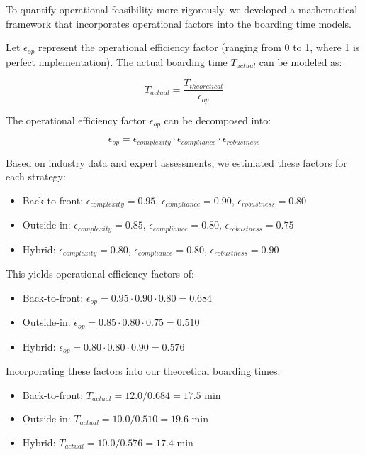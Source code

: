 To quantify operational feasibility more rigorously, we developed a mathematical framework that incorporates operational factors into the boarding time models.

Let $\epsilon_{op}$ represent the operational efficiency factor (ranging from 0 to 1, where 1 is perfect implementation). The actual boarding time $T_{actual}$ can be modeled as:

\begin{equation}
T_{actual} = \frac{T_{theoretical}}{\epsilon_{op}}
\end{equation}

The operational efficiency factor $\epsilon_{op}$ can be decomposed into:

\begin{equation}
\epsilon_{op} = \epsilon_{complexity} \cdot \epsilon_{compliance} \cdot \epsilon_{robustness}
\end{equation}

Based on industry data and expert assessments, we estimated these factors for each strategy:

\begin{itemize}
    \item Back-to-front: $\epsilon_{complexity} = 0.95$, $\epsilon_{compliance} = 0.90$, $\epsilon_{robustness} = 0.80$
    \item Outside-in: $\epsilon_{complexity} = 0.85$, $\epsilon_{compliance} = 0.80$, $\epsilon_{robustness} = 0.75$
    \item Hybrid: $\epsilon_{complexity} = 0.80$, $\epsilon_{compliance} = 0.80$, $\epsilon_{robustness} = 0.90$
\end{itemize}

This yields operational efficiency factors of:
\begin{itemize}
    \item Back-to-front: $\epsilon_{op} = 0.95 \cdot 0.90 \cdot 0.80 = 0.684$
    \item Outside-in: $\epsilon_{op} = 0.85 \cdot 0.80 \cdot 0.75 = 0.510$
    \item Hybrid: $\epsilon_{op} = 0.80 \cdot 0.80 \cdot 0.90 = 0.576$
\end{itemize}

Incorporating these factors into our theoretical boarding times:

\begin{itemize}
    \item Back-to-front: $T_{actual} = 12.0 / 0.684 = 17.5$ min
    \item Outside-in: $T_{actual} = 10.0 / 0.510 = 19.6$ min
    \item Hybrid: $T_{actual} = 10.0 / 0.576 = 17.4$ min
\end{itemize}

